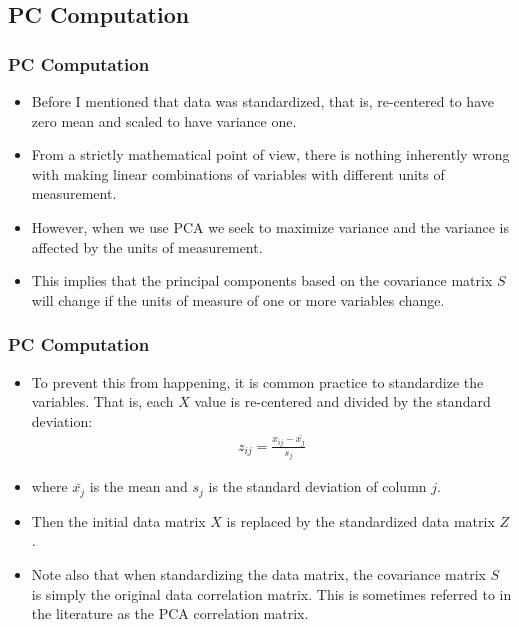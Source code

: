 \documentclass[
  shownotes,
  xcolor={svgnames},
  hyperref={colorlinks,citecolor=DarkBlue,linkcolor=DarkRed,urlcolor=DarkBlue}
  , aspectratio=169]{beamer}
\begin{document}
\subsection{PC Computation}
\begin{frame}[fragile]
\frametitle{PC Computation}

\begin{itemize}

\item Before I mentioned that  data was standardized, that is, re-centered to have zero mean and scaled to have variance one. 
\medskip
\item From a strictly mathematical point of view, there is nothing inherently wrong with making linear combinations of variables with different units of measurement. 
\medskip
\item However, when we use PCA we seek to maximize variance and the variance is affected by the units of measurement. 
\medskip
\item This implies that the principal components based on the covariance matrix $ S $ will change if the units of measure of one or more variables change. 


\end{itemize}


\end{frame}
\begin{frame}[fragile]
\frametitle{PC Computation}

\begin{itemize}
  \item To prevent this from happening, it is common practice to standardize the variables. That is, each $ X $ value is re-centered and divided by the standard deviation:
  \medskip
    \begin{align}
      z_{ij}=\frac{x_{ij}-\bar{x_j}}{s_j}
    \end{align}
  \medskip
  \item  where $\bar{x_j}$ is the mean and ${s_j}$ is the standard deviation of column $j$. 
  \medskip
  \item Then the initial data matrix $ X $ is replaced by the standardized data matrix $ Z $.
  \medskip
  \item Note also that when standardizing the data matrix, the covariance matrix $ S $ is simply the original data correlation matrix. This is sometimes referred to in the literature as the PCA correlation matrix.
\end{itemize}

\end{frame}
\end{document}
